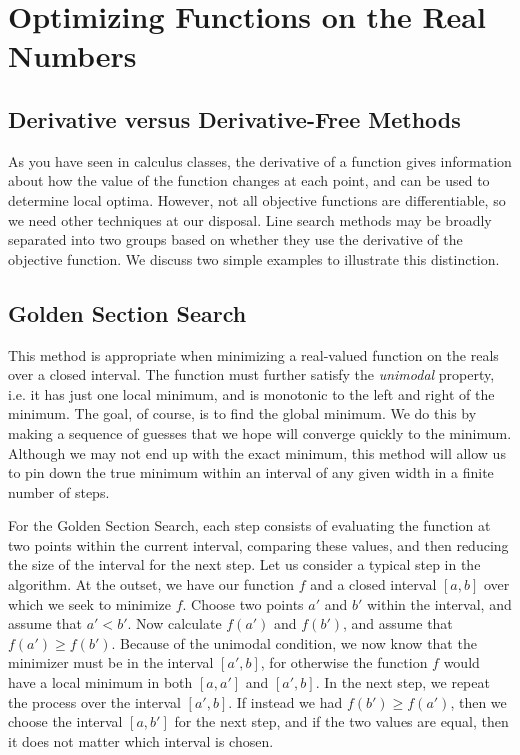 \section*{Optimizing Functions on the Real Numbers}
\subsection*{Derivative versus Derivative-Free Methods}
As you have seen in calculus classes, the derivative of a function gives information
about how the value of the function changes at each point, and can be used to determine
local optima. However, not all objective functions are differentiable, so we need other
techniques at our disposal. Line search methods may be broadly separated into two groups
based on whether they use the derivative of the objective function. We discuss two
simple examples to illustrate this distinction.

\subsection*{Golden Section Search}
This method is appropriate when minimizing a real-valued function on the reals over a
closed interval. The function must further satisfy the \emph{unimodal} property, i.e.
it has just one local minimum, and is monotonic to the left and right of the minimum.
The goal, of course, is to find the
global minimum. We do this by making a sequence of guesses that we hope will converge
quickly to the minimum. Although we may not end up with the exact minimum, this method
will allow us to pin down the true minimum within an interval of any given width in a
finite number of steps.

For the Golden Section Search, each step consists of evaluating the function at two
points within the current interval, comparing these values, and then reducing the size
of the interval for the next step. Let us consider a typical step in the algorithm. At
the outset, we have our function $f$ and a closed interval $[a, b]$ over which we seek
to minimize $f$. Choose two points $a'$ and $b'$ within the interval, and assume that
$a' < b'$. Now calculate $f(a')$ and $f(b')$, and assume that $f(a') \geq f(b')$.
Because of the unimodal condition, we now know that the minimizer must be in the
interval $[a', b]$, for otherwise the function $f$ would have a local minimum in
both $[a, a']$ and $[a', b]$. In the next step, we repeat the process over the interval
$[a', b]$. If instead we had $f(b') \geq f(a')$, then we choose the interval $[a, b']$
for the next step, and if the two values are equal, then it does not matter which
interval is chosen.

